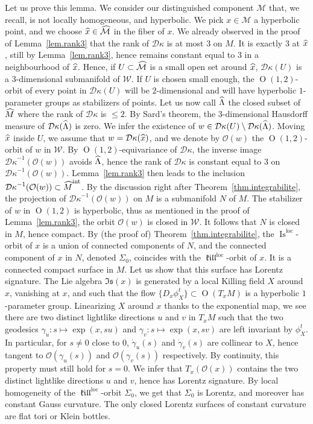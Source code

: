 \documentclass[11pt]{article}
\theoremstyle{definition}
\numberwithin{equation}{section}
\numberwithin{figure}{section}
\numberwithin{table}{section}
\DeclareMathOperator{\Omp}{O}%
\DeclareMathOperator{\Is}{Is}
\DeclareMathOperator{\loc}{loc}
\newcommand{\hmint}{{{\hat M}^{\intl}}}
\DeclareMathOperator{\intl}{int}
\DeclareMathOperator{\kil}{{\mathfrak{kill}}}
\newcommand{\kiloc}{\kil^{\loc}}
\newcommand{\calm}{\mathcal{M}}
\newcommand{\calo}{\mathcal{O}}
\newcommand{\calw}{\mathcal{W}}
\newcommand{\hcalm}{\hat{\mathcal{M}}}
\newcommand*\dk{{\mathcal{D}\kappa}}
\newcommand{\hm}{{\hat{M}}}
\newcommand{\hx}{{\hat{x}}}
\let\oldhat\hat
\renewcommand*\hat[1]{\mathchoice{\widehat{#1}}{\widehat{#1}}{\widehat{#1}}{\oldhat{#1}}}
\begin{document}
Let us prove this lemma. We consider our distinguished component ${\mathcal M}$ that, we recall, is not locally homogeneous, and hyperbolic. We pick $x \in \calm$ a hyperbolic point, and we choose $\hx \in {\hat{\calm}}$ in the fiber of $x$. We already observed in the proof of Lemma~\ref{lem.rank3} that the rank of $\dk$ is at most $3$ on $M$. It is exactly $3$ at $\hx$, still by Lemma~\ref{lem.rank3}, hence remains constant equal to $3$ in a neighbourhood of $\hx$. Hence, if $U \subset \hcalm$ is a small open set around $\hx$, $\dk(U)$ is a $3$-dimensional submanifold of ${\mathcal W}$. If $U$ is chosen small enough, the $\Omp(1,2)$-orbit of every point in $\dk(U)$ will be $2$-dimensional and will have hyperbolic $1$-parameter groups as stabilizers of points. Let us now call $\hat{\Lambda}$ the closed subset of $\hm$ where the rank of $\dk$ is $ \leq2$. By Sard's theorem, the $3$-dimensional Hausdorff measure of $\dk(\hat{\Lambda})$ is zero. We infer the existence of $w \in \dk(U) \setminus \dk(\hat{\Lambda})$. Moving $\hx$ inside $U$, we assume that $w=\dk(\hx)$, and we denote by $\calo(w)$ the $\Omp(1,2)$-orbit of $w$ in $\calw$. By $\Omp(1,2)$-equivariance of $\dk$, the inverse image $\dk^{-1}({\mathcal O}(w))$ avoids $\hat{\Lambda}$, hence the rank of $\dk$ is constant equal to $3$ on $\dk^{-1}({\mathcal O}(w))$. Lemma~\ref{lem.rank3} then leads to the inclusion $\dk^{-1}({\mathcal O}(w)) \subset \hmint$. By the discussion right after Theorem~\ref{thm.integrabilite}, the projection of $\dk^{-1}({\mathcal O}(w))$ on $M$ is a submanifold $N$ of $M$. The stabilizer of $w$ in $\Omp(1,2)$ is hyperbolic, thus as mentioned in the proof of Lemma~\ref{lem.rank3}, the orbit $\calo(w)$ is closed in $\calw$. It follows that $N$ is closed in $M$, hence compact. By (the proof of) Theorem~\ref{thm.integrabilite}, the $\Is^{\loc}$-orbit of $x$ is a union of connected components of $N$, and the connected component of $x$ in $N$, denoted $\Sigma_{0}$, coincides with the $\kiloc$-orbit of $x$. It is a connected compact surface in $M$. Let us show that this surface has Lorentz signature. The Lie algebra $\mathfrak{Is}(x)$ is generated by a local Killing field $X$ around $x$, vanishing at $x$, and such that the flow $\{D_{x}\phi_X^t\}
\subset \Omp(T_{x}M)$ is a hyperbolic $1$-parameter group. Linearizing $X$ around $x$ thanks to the exponential map, we see there are two distinct lightlike directions $u$ and $v$ in ${T}_{x}M$ such that the two geodesics $\gamma_u: s \mapsto \exp(x,su)$ and $\gamma_v: s \mapsto \exp(x,sv)$ are left invariant by $\phi_X^t$. In particular, for $s \not =0$ close to $0$, $\dot{\gamma}_u(s)$ and $\dot{\gamma}_v(s)$ are collinear to $X$, hence tangent to ${\mathcal O}(\gamma_u(s))$ and ${\mathcal O}(\gamma_v(s))$ respectively. By continuity, this property must still hold for $s=0$. We infer that ${T}_{x}({\mathcal O}(x))$ contains the two distinct lightlike directions $u$ and $v$, hence has Lorentz signature. By local homogeneity of the $\kiloc$-orbit $\Sigma_0$, we get that $\Sigma_0$ is Lorentz, and moreover has constant Gauss curvature. The only closed Lorentz surfaces of constant curvature are flat tori or Klein bottles.
\end{document}
